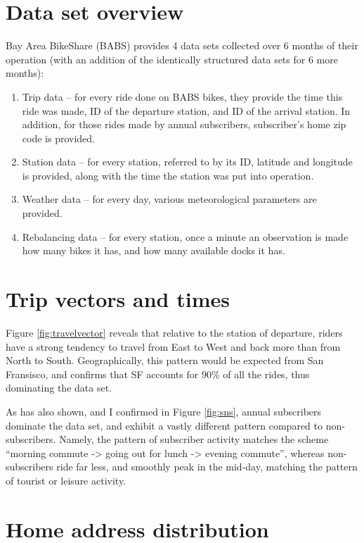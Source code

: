 \documentclass{article}
\begin{document}
\section{Data set overview}

Bay Area BikeShare (BABS) provides 4 data sets collected over 6 months of their operation (with an addition of the identically structured data sets for 6 more months):
\begin{enumerate}
	\item
		Trip data -- for every ride done on BABS bikes, they provide the time this ride was made, ID of the departure station, and ID of the arrival station. In addition, for those rides made by annual subscribers, subscriber's home zip code is provided.
	\item
		Station data -- for every station, referred to by its ID, latitude and longitude is provided, along with the time the station was put into operation.
	\item
		Weather data -- for every day, various meteorological parameters are provided.
	\item
		Rebalancing data -- for every station, once a minute an observation is made how many bikes it has, and how many available docks it has.
\end{enumerate}

\section{Trip vectors and times}
Figure \ref{fig:travelvector} reveals that relative to the station of departure, riders have a strong tendency to travel from East to West and back more than from North to South. Geographically, this pattern would be expected from San Fransisco, and \cite{babs} confirms that SF accounts for 90\% of all the rides, thus dominating the data set.

As \cite{babs} has also shown, and I confirmed in Figure \ref{fig:sns}, annual subscribers dominate the data set, and exhibit a vastly different pattern compared to non-subscribers. Namely, the pattern of subscriber activity matches the scheme ``morning commute -> going out for lunch -> evening commute'', whereas non-subscribers ride far less, and smoothly peak in the mid-day, matching the pattern of tourist or leisure activity.

\section{Home address distribution}
\end{document}
